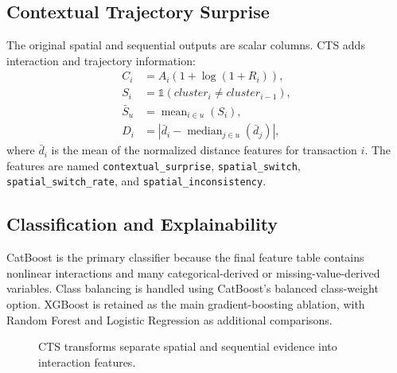 \documentclass[conference]{IEEEtran}
\begin{document}
\subsection{Contextual Trajectory Surprise}
The original spatial and sequential outputs are scalar columns. CTS adds interaction and trajectory information:
\begin{align}
    C_i &= A_i\left(1+\log(1+R_i)\right),\\
    S_i &= \mathbb{1}(cluster_i\ne cluster_{i-1}),\\
    \bar{S}_u &= \operatorname{mean}_{i\in u}(S_i),\\
    D_i &= \left|\bar{d}_i-\operatorname{median}_{j\in u}(\bar{d}_j)\right|,
\end{align}
where $\bar{d}_i$ is the mean of the normalized distance features for transaction $i$. The features are named \texttt{contextual\_surprise}, \texttt{spatial\_switch}, \texttt{spatial\_switch\_rate}, and \texttt{spatial\_inconsistency}.

\subsection{Classification and Explainability}
CatBoost is the primary classifier because the final feature table contains nonlinear interactions and many categorical-derived or missing-value-derived variables. Class balancing is handled using CatBoost's balanced class-weight option. XGBoost is retained as the main gradient-boosting ablation, with Random Forest and Logistic Regression as additional comparisons.

\begin{figure}[t]
\centering
{}
\caption{CTS transforms separate spatial and sequential evidence into interaction features.}
\label{fig:cts}
\end{figure}
\end{document}
